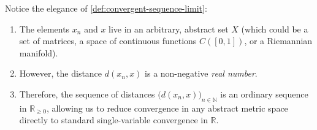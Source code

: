 \begin{content}

\begin{steps}
Notice the elegance of \cref{def:convergent-sequence-limit}:
\begin{enumerate}[label=\textbf{(\arabic*)}]
    \setcounter{enumi}{0} \item The elements $x_n$ and $x$ live in an arbitrary, abstract set $X$ (which could be a set of matrices, a space of continuous functions $C([0, 1])$, or a Riemannian manifold).
    \setcounter{enumi}{1} \item However, the distance $d(x_n, x)$ is a non-negative \emph{real number}.
    \setcounter{enumi}{2} \item Therefore, the sequence of distances $\big(d(x_n, x)\big)_{n \in \mathbb{N}}$ is an ordinary sequence in $\mathbb{R}_{\ge 0}$, allowing us to reduce convergence in any abstract metric space directly to standard single-variable convergence in $\mathbb{R}$.
\end{enumerate}
\end{steps}
\end{content}

\begin{hidden}
\end{hidden}

